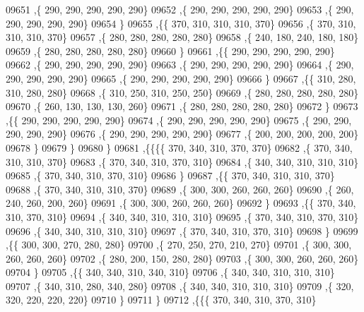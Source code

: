 \begin{DoxyCode}
09651     ,\{   290,   290,   290,   290,   290\}
09652     ,\{   290,   290,   290,   290,   290\}
09653     ,\{   290,   290,   290,   290,   290\}
09654     \}
09655    ,\{\{   370,   310,   310,   310,   370\}
09656     ,\{   370,   310,   310,   310,   370\}
09657     ,\{   280,   280,   280,   280,   280\}
09658     ,\{   240,   180,   240,   180,   180\}
09659     ,\{   280,   280,   280,   280,   280\}
09660     \}
09661    ,\{\{   290,   290,   290,   290,   290\}
09662     ,\{   290,   290,   290,   290,   290\}
09663     ,\{   290,   290,   290,   290,   290\}
09664     ,\{   290,   290,   290,   290,   290\}
09665     ,\{   290,   290,   290,   290,   290\}
09666     \}
09667    ,\{\{   310,   280,   310,   280,   280\}
09668     ,\{   310,   250,   310,   250,   250\}
09669     ,\{   280,   280,   280,   280,   280\}
09670     ,\{   260,   130,   130,   130,   260\}
09671     ,\{   280,   280,   280,   280,   280\}
09672     \}
09673    ,\{\{   290,   290,   290,   290,   290\}
09674     ,\{   290,   290,   290,   290,   290\}
09675     ,\{   290,   290,   290,   290,   290\}
09676     ,\{   290,   290,   290,   290,   290\}
09677     ,\{   200,   200,   200,   200,   200\}
09678     \}
09679    \}
09680   \}
09681  ,\{\{\{\{   370,   340,   310,   370,   370\}
09682     ,\{   370,   340,   310,   310,   370\}
09683     ,\{   370,   340,   310,   370,   310\}
09684     ,\{   340,   340,   310,   310,   310\}
09685     ,\{   370,   340,   310,   370,   310\}
09686     \}
09687    ,\{\{   370,   340,   310,   310,   370\}
09688     ,\{   370,   340,   310,   310,   370\}
09689     ,\{   300,   300,   260,   260,   260\}
09690     ,\{   260,   240,   260,   200,   260\}
09691     ,\{   300,   300,   260,   260,   260\}
09692     \}
09693    ,\{\{   370,   340,   310,   370,   310\}
09694     ,\{   340,   340,   310,   310,   310\}
09695     ,\{   370,   340,   310,   370,   310\}
09696     ,\{   340,   340,   310,   310,   310\}
09697     ,\{   370,   340,   310,   370,   310\}
09698     \}
09699    ,\{\{   300,   300,   270,   280,   280\}
09700     ,\{   270,   250,   270,   210,   270\}
09701     ,\{   300,   300,   260,   260,   260\}
09702     ,\{   280,   200,   150,   280,   280\}
09703     ,\{   300,   300,   260,   260,   260\}
09704     \}
09705    ,\{\{   340,   340,   310,   340,   310\}
09706     ,\{   340,   340,   310,   310,   310\}
09707     ,\{   340,   310,   280,   340,   280\}
09708     ,\{   340,   340,   310,   310,   310\}
09709     ,\{   320,   320,   220,   220,   220\}
09710     \}
09711    \}
09712   ,\{\{\{   370,   340,   310,   370,   310\}

\end{DoxyCode}

